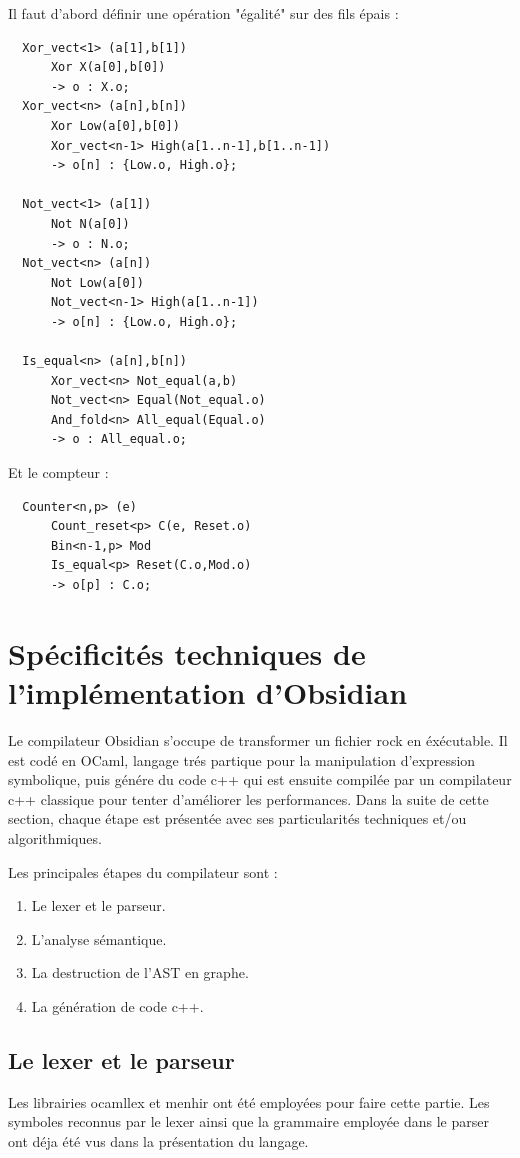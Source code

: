 \documentclass[13pt]{article}
\begin{document}
Il faut d'abord définir une opération "égalité" sur des fils épais :
\begin{verbatim}
  Xor_vect<1> (a[1],b[1])
      Xor X(a[0],b[0])
      -> o : X.o;
  Xor_vect<n> (a[n],b[n])
      Xor Low(a[0],b[0])
      Xor_vect<n-1> High(a[1..n-1],b[1..n-1])
      -> o[n] : {Low.o, High.o};

  Not_vect<1> (a[1])
      Not N(a[0])
      -> o : N.o;
  Not_vect<n> (a[n])
      Not Low(a[0])
      Not_vect<n-1> High(a[1..n-1])
      -> o[n] : {Low.o, High.o};

  Is_equal<n> (a[n],b[n])
      Xor_vect<n> Not_equal(a,b)
      Not_vect<n> Equal(Not_equal.o)
      And_fold<n> All_equal(Equal.o)
      -> o : All_equal.o;
\end{verbatim}

Et le compteur :
\begin{verbatim}
  Counter<n,p> (e)
      Count_reset<p> C(e, Reset.o)
      Bin<n-1,p> Mod
      Is_equal<p> Reset(C.o,Mod.o)
      -> o[p] : C.o;
\end{verbatim}


\section{Spécificités techniques de l'implémentation d'Obsidian}

Le compilateur Obsidian s'occupe de transformer un fichier rock en éxécutable.
Il est codé en OCaml, langage trés partique pour la manipulation d'expression
symbolique, puis génére du code c++ qui est ensuite compilée par un compilateur
c++ classique pour tenter d'améliorer les performances. Dans la suite de cette
section, chaque étape est présentée avec ses particularités techniques et/ou
algorithmiques.

Les principales étapes du compilateur sont :
\begin{enumerate}
\item Le lexer et le parseur.
\item L'analyse sémantique.
\item La \og destruction \fg{} de l'AST en graphe.
\item La génération de code c++.
\end{enumerate}

\subsection{Le lexer et le parseur}

Les librairies ocamllex et menhir ont été employées pour faire cette partie. Les
symboles reconnus par le lexer ainsi que la grammaire employée dans le parser
ont déja été vus dans la présentation du langage. 
\end{document}
